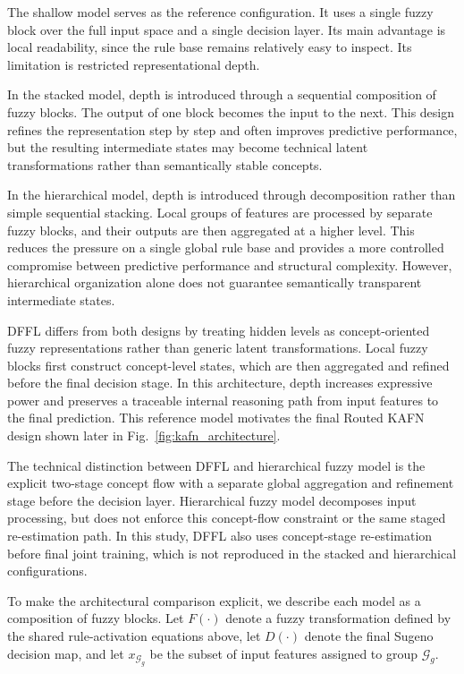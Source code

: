 \documentclass[runningheads]{llncs}
\begin{document}
The shallow model serves as the reference configuration. It uses a single fuzzy block over the full input space and a single decision layer. Its main advantage is local readability, since the rule base remains relatively easy to inspect. Its limitation is restricted representational depth.

In the stacked model, depth is introduced through a sequential composition of fuzzy blocks. The output of one block becomes the input to the next. This design refines the representation step by step and often improves predictive performance, but the resulting intermediate states may become technical latent transformations rather than semantically stable concepts.

In the hierarchical model, depth is introduced through decomposition rather than simple sequential stacking. Local groups of features are processed by separate fuzzy blocks, and their outputs are then aggregated at a higher level. This reduces the pressure on a single global rule base and provides a more controlled compromise between predictive performance and structural complexity. However, hierarchical organization alone does not guarantee semantically transparent intermediate states.

DFFL differs from both designs by treating hidden levels as concept-oriented fuzzy representations rather than generic latent transformations. Local fuzzy blocks first construct concept-level states, which are then aggregated and refined before the final decision stage. In this architecture, depth increases expressive power and preserves a traceable internal reasoning path from input features to the final prediction. This reference model motivates the final Routed KAFN design shown later in Fig.~\ref{fig:kafn_architecture}.

The technical distinction between DFFL and hierarchical fuzzy model is the explicit two-stage concept flow with a separate global aggregation and refinement stage before the decision layer. Hierarchical fuzzy model decomposes input processing, but does not enforce this concept-flow constraint or the same staged re-estimation path. In this study, DFFL also uses concept-stage re-estimation before final joint training, which is not reproduced in the stacked and hierarchical configurations.

To make the architectural comparison explicit, we describe each model as a composition of fuzzy blocks. Let $F(\cdot)$ denote a fuzzy transformation defined by the shared rule-activation equations above, let $D(\cdot)$ denote the final Sugeno decision map, and let $x_{\mathcal{G}_g}$ be the subset of input features assigned to group $\mathcal{G}_g$.
\end{document}
